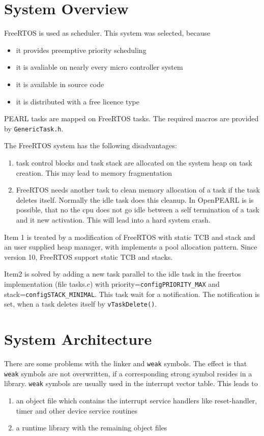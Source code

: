\section{System Overview}
FreeRTOS is used as scheduler. This system was selected, because
\begin{itemize}
\item it provides preemptive priority scheduling
\item it is avaliable on nearly every micro controller system
\item it is available in source code
\item it is distributed with a free licence type
\end{itemize}

PEARL tasks are mapped on FreeRTOS tasks. The required macros
are provided by \texttt{GenericTask.h}.

The FreeRTOS system has the following disadvantages:
\begin{enumerate}
\item task control blocks and task stack are allocated on the system
   heap on task creation. This may lead to memory fragmentation
\item FreeRTOS needs another task to clean memory allocation of a task if 
   the task deletes itself. Normally the idle task does this cleanup.
   In OpenPEARL is is possible, that no the cpu does not go idle 
   between a self termination of a task and it new activation. This 
   will lead into a hard system crash.
\end{enumerate}

Item 1 is treated by a modification of FreeRTOS with static TCB and stack
and an user supplied heap manager, with implements a pool allocation pattern.
Since version 10, FreeRTOS support static TCB and stacks.

Item2 is solved by adding a new task parallel  to the idle task 
  in the freertos implementation (file tasks.c) with
  priority=\texttt{configPRIORITY\_MAX} and stack=\texttt{configSTACK\_MINIMAL}.
  This task wait for a notification. The notification is set, when 
  a task deletes itself by \texttt{vTaskDelete()}.


\section{System Architecture}
There are some problems with the linker and \texttt{weak} symbols.
The effect is that \texttt{weak} symbols are not overwritten, if
a corresponding strong symbol resides in a library.
\texttt{weak} symbols are usually used in the interrupt vector table.
This leads to
\begin{enumerate}
\item an object file which contains the interrupt service handlers like
   reset-handler, timer and other device service routines
\item a runtime library with the remaining object files
\end{enumerate}

